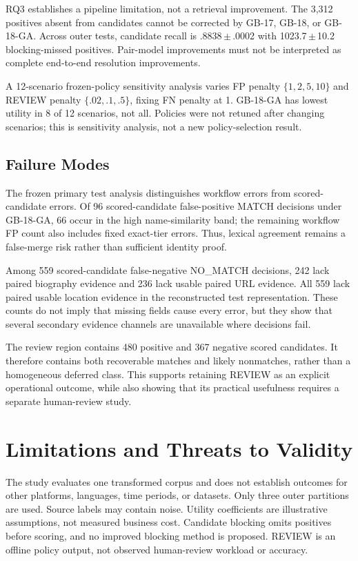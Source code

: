 \documentclass[conference]{IEEEtran}
\newcommand{\pmv}{\,$\pm$\,}
\begin{document}
RQ3 establishes a pipeline limitation, not a retrieval improvement. The 3,312 positives absent from candidates cannot be corrected by GB-17, GB-18, or GB-18-GA. Across outer tests, candidate recall is .8838\pmv.0002 with 1023.7\pmv10.2 blocking-missed positives. Pair-model improvements must not be interpreted as complete end-to-end resolution improvements.

A 12-scenario frozen-policy sensitivity analysis varies FP penalty $\{1,2,5,10\}$ and REVIEW penalty $\{.02,.1,.5\}$, fixing FN penalty at 1. GB-18-GA has lowest utility in 8 of 12 scenarios, not all. Policies were not retuned after changing scenarios; this is sensitivity analysis, not a new policy-selection result.

\subsection{Failure Modes}
The frozen primary test analysis distinguishes workflow errors from scored-candidate errors. Of 96 scored-candidate false-positive MATCH decisions under GB-18-GA, 66 occur in the high name-similarity band; the remaining workflow FP count also includes fixed exact-tier errors. Thus, lexical agreement remains a false-merge risk rather than sufficient identity proof.

Among 559 scored-candidate false-negative NO\_MATCH decisions, 242 lack paired biography evidence and 236 lack usable paired URL evidence. All 559 lack paired usable location evidence in the reconstructed test representation. These counts do not imply that missing fields cause every error, but they show that several secondary evidence channels are unavailable where decisions fail.

The review region contains 480 positive and 367 negative scored candidates. It therefore contains both recoverable matches and likely nonmatches, rather than a homogeneous deferred class. This supports retaining REVIEW as an explicit operational outcome, while also showing that its practical usefulness requires a separate human-review study.

\section{Limitations and Threats to Validity}
The study evaluates one transformed corpus and does not establish outcomes for other platforms, languages, time periods, or datasets. Only three outer partitions are used. Source labels may contain noise. Utility coefficients are illustrative assumptions, not measured business cost. Candidate blocking omits positives before scoring, and no improved blocking method is proposed. REVIEW is an offline policy output, not observed human-review workload or accuracy.
\end{document}
